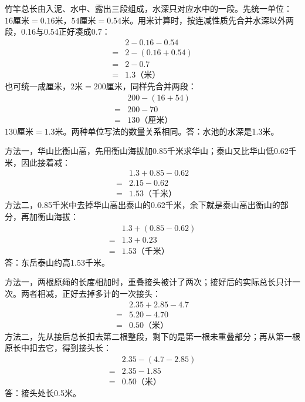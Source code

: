 \documentclass[multi=snippet,border=0pt]{standalone}
\newenvironment{snippet}[3]{\begin{minipage}{#1bp}\color{answerred}\fontsize{#2}{#3}\selectfont\raggedright}{\end{minipage}}
\begin{document}
\begin{snippet}{505}{11.5}{14}竹竿总长由入泥、水中、露出三段组成，水深只对应水中的一段。先统一单位：\(16\text{厘米}=0.16\text{米}\)，\(54\text{厘米}=0.54\text{米}\)。用米计算时，按连减性质先合并水深以外两段，0.16与0.54正好凑成0.7：\[\begin{aligned}&2-0.16-0.54\\={}&2-(0.16+0.54)\\={}&2-0.7\\={}&1.3\text{（米）}\end{aligned}\]也可统一成厘米，\(2\text{米}=200\text{厘米}\)，同样先合并两段：\[\begin{aligned}&200-(16+54)\\={}&200-70\\={}&130\text{（厘米）}\end{aligned}\]\(130\text{厘米}=1.3\text{米}\)。两种单位写法的数量关系相同。答：水池的水深是1.3米。\end{snippet}
\begin{snippet}{505}{11.5}{14}方法一，华山比衡山高，先用衡山海拔加0.85千米求华山；泰山又比华山低0.62千米，因此接着减：\[\begin{aligned}&1.3+0.85-0.62\\={}&2.15-0.62\\={}&1.53\text{（千米）}\end{aligned}\]方法二，0.85千米中去掉华山高出泰山的0.62千米，余下就是泰山高出衡山的部分，再加衡山海拔：\[\begin{aligned}&1.3+(0.85-0.62)\\={}&1.3+0.23\\={}&1.53\text{（千米）}\end{aligned}\]答：东岳泰山约高1.53千米。\end{snippet}
\begin{snippet}{505}{11.5}{14}方法一，两根原绳的长度相加时，重叠接头被计了两次；接好后的实际总长只计一次。两者相减，正好去掉多计的一次接头：\[\begin{aligned}&2.35+2.85-4.7\\={}&5.20-4.70\\={}&0.50\text{（米）}\end{aligned}\]方法二，先从接后总长扣去第二根整段，剩下的是第一根未重叠部分；再从第一根原长中扣去它，得到接头长：\[\begin{aligned}&2.35-(4.7-2.85)\\={}&2.35-1.85\\={}&0.50\text{（米）}\end{aligned}\]答：接头处长0.5米。\end{snippet}
\end{document}
